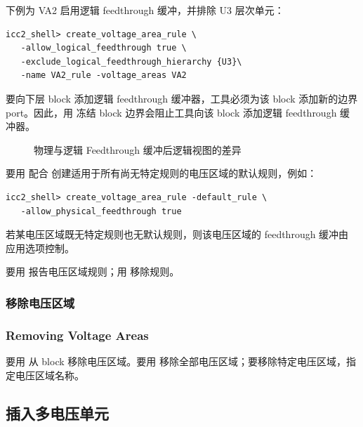 \begin{itemize}
    下例为 VA2 启用逻辑 feedthrough 缓冲，并排除 U3 层次单元：
\begin{lstlisting}
icc2_shell> create_voltage_area_rule \
   -allow_logical_feedthrough true \
   -exclude_logical_feedthrough_hierarchy {U3}\
   -name VA2_rule -voltage_areas VA2
\end{lstlisting}

\begin{noteBox}
要向下层 block 添加逻辑 feedthrough 缓冲器，工具必须为该 block 添加新的边界 port。因此，用  冻结 block 边界会阻止工具向该 block 添加逻辑 feedthrough 缓冲器。
\end{noteBox}
\end{itemize}

\begin{figure}[htbp]
\centering
{}
\caption{物理与逻辑 Feedthrough 缓冲后逻辑视图的差异}
\label{fig:ft-buf-diff}
\end{figure}

要用  配合  创建适用于所有尚无特定规则的电压区域的默认规则，例如：
\begin{lstlisting}
icc2_shell> create_voltage_area_rule -default_rule \
   -allow_physical_feedthrough true
\end{lstlisting}

若某电压区域既无特定规则也无默认规则，则该电压区域的 feedthrough 缓冲由  应用选项控制。

要用  报告电压区域规则；用  移除规则。

\subsubsection{移除电压区域}
\subsubsection*{Removing Voltage Areas}

要用  从 block 移除电压区域。要用  移除全部电压区域；要移除特定电压区域，指定电压区域名称。

\subsection{插入多电压单元}

